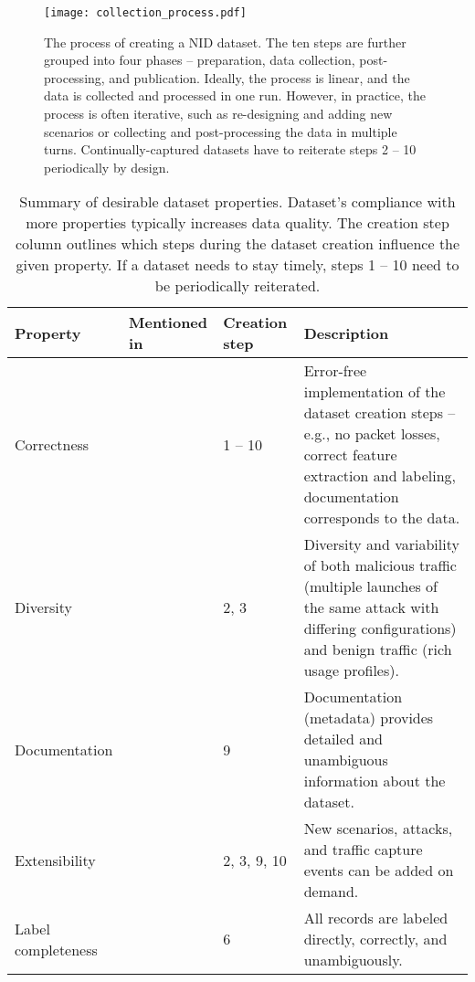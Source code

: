 \begin{figure*}[t]
    \centering
    \texttt{[image: collection\_process.pdf]}
    \caption{The process of creating a NID dataset. The ten steps are further grouped into four phases -- preparation, data collection, post-processing, and publication. Ideally, the process is linear, and the data is collected and processed in one run. However, in practice, the process is often iterative, such as re-designing and adding new scenarios or collecting and post-processing the data in multiple turns. Continually-captured datasets have to reiterate steps 2 -- 10 periodically by design.}
    \label{fig:dataset_creation}
\end{figure*}

\begin{table*}[t]
    \small
    \centering
    \caption{Summary of desirable dataset properties. Dataset's compliance with more properties typically increases data quality. The creation step column outlines which steps during the dataset creation influence the given property. If a dataset needs to stay timely, steps 1 -- 10 need to be periodically reiterated.}
    \vspace*{1em}
    \begin{tabular}{p{2.5cm} p{2.1cm} p{1.8cm} p{10cm}}
    \textbf{Property} & \textbf{Mentioned in} & \textbf{Creation step} & \textbf{Description} \\
    \toprule
    Correctness & \cite{viegas2017_trabid_dataset,malowidzki2015_network} & 1 -- 10 & Error-free implementation of the dataset creation steps -- e.g., no packet losses, correct feature extraction and labeling, documentation corresponds to the data. \\ \midrule
    Diversity & \cite{catillo2023_ml_public_ids_datasets,ring2019_nids_datasets_survey,marciafernandez2018_ugr16} & 2, 3 & Diversity and variability of both malicious traffic (multiple launches of the same attack with differing configurations) and benign traffic (rich usage profiles). \\ \midrule
    Documentation & \cite{landauer2023_ait_ldsv2_dataset,ring2019_nids_datasets_survey,marciafernandez2018_ugr16} & 9 & Documentation (metadata) provides detailed and unambiguous information about the dataset. \\ \midrule
    Extensibility & \cite{kenyon2020_public_ids_datasets_fit} & 2, 3, 9, 10 & New scenarios, attacks, and traffic capture events can be added on demand. \\ \midrule
    Label completeness & \cite{apruzzese2022_sok_unlabeled_data,ring2019_nids_datasets_survey,marciafernandez2018_ugr16,malowidzki2015_network} & 6 & All records are labeled directly, correctly, and unambiguously. \\ \midrule

\end{tabular}
\end{table*}
